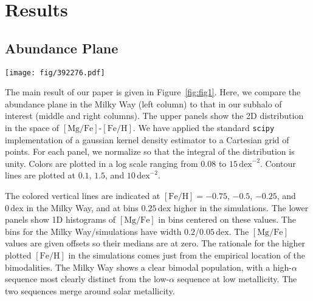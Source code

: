 \documentclass[linenumbers, twocolumn]{aastex631}
\newcommand{\FeH}{\ensuremath{[\textrm{Fe}/\textrm{H}]}}
\newcommand{\MgFe}{\ensuremath{[\textrm{Mg}/\textrm{Fe}]}}
\newcommand{\dex}{\ensuremath{\textrm{dex}}}
\begin{document}
\section{Results}\label{sec:results}
\subsection{Abundance Plane}\label{ssec:plane}

\begin{figure*}
  \centering
  \texttt{[image: fig/392276.pdf]}
  \caption{\textbf{When old stars are $\alpha$-enhanced, our subhalo of interest from TNG displays a prominent bimodality.} The upper left panel shows the distribution in the \MgFe{}-\FeH{} plane of the Milky Way, demonstrating a clear bimodality (data selection given in text). The lower left panel shows the 1D histograms of \MgFe{} at fixed \FeH{} values of $-0.5$, $-0.25$, $0$, and $0.25$ (blue, orange, green, and red, respectively). In the Milky Way, the bimodality is strongest at low metallicities while disappearing at high metallicities. The middle column shows the same plots but for our TNG subhalo of interest (392276) and with the fixed \FeH{} values $0.25\,\dex$ lower. Only faint structure is seen in the lowest bin (blue, $-0.75\,\dex$). The right column shows the same subhalo but after increasing the \MgFe{} value of star particles formed before $z=1.5$ linearly with formation time (specifically by incrementing \MgFe{} by $0.1\times\left(t_{1.5}-t_{\textrm{form}}\right)$ if $t_{\textrm{form}} < t_{1.5}$, where $t_{1.5}$ is the age of the universe at $z=1.5$). A clear bimodality is shown in these panels which, unlike in the Milky Way, is present at all metallicities.}
  \label{fig:fig1}
\end{figure*}

The main result of our paper is given in Figure~\ref{fig:fig1}. Here, we compare the abundance plane in the Milky Way (left column) to that in our subhalo of interest (middle and right columns). The upper panels show the 2D distribution in the space of \MgFe{}-\FeH{}. We have applied the standard \texttt{scipy} implementation of a gaussian kernel density estimator to a Cartesian grid of points. For each panel, we normalize so that the integral of the distribution is unity. Colors are plotted in a log scale ranging from $0.08$ to $15\,\dex^{-2}$. Contour lines are plotted at $0.1$, $1.5$, and $10\,\dex^{-2}$.

The colored vertical lines are indicated at $\FeH=-0.75$, $-0.5$, $-0.25$, and $0\,\dex$ in the Milky Way, and at bins $0.25\,\dex$ higher in the simulations. The lower panels show 1D histograms of \MgFe{} in bins centered on these values. The bins for the Milky Way/simulations have width $0.2$/$0.05\,\dex$. The \MgFe{} values are given offsets so their medians are at zero. The rationale for the higher plotted \FeH{} in the simulations comes just from the empirical location of the bimodalities. The Milky Way shows a clear bimodal population, with a high-$\alpha$ sequence most clearly distinct from the low-$\alpha$ sequence at low metallicity. The two sequences merge around solar metallicity.
\end{document}
